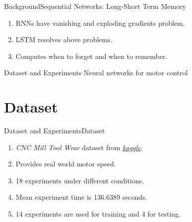 \documentclass[handout]{beamer}
\begin{document}
\begin{frame}{Background}{Sequential Networks: Long-Short Term Memory}
  \begin{enumerate}
    \item RNNs have vanishing and exploding gradients problem.
    \item LSTM resolves above problems.
    \item Computes when to forget and when to remember.
  \end{enumerate}
\end{frame}

%

\begin{frame}{Dataset and Experiments}
  \center\Large{\color{blue}Neural networks for motor control}
\end{frame}

\section{Dataset}
\begin{frame}{Dataset and Experiments}{Dataset}
  \begin{enumerate}
    \item \textit{CNC Mill Tool Wear} dataset from \href{https://www.kaggle.com/shasun/tool-wear-detection-in-cnc-mill}{\color{blue}\textit{kaggle}}.
    \item Provides real world motor speed.
    \item 18 experiments under different conditions.
    \item Mean experiment time is 136.6389 seconds.
    \item 14 experiments are used for training and 4 for testing.
  \end{enumerate}
\end{frame}
\end{document}
